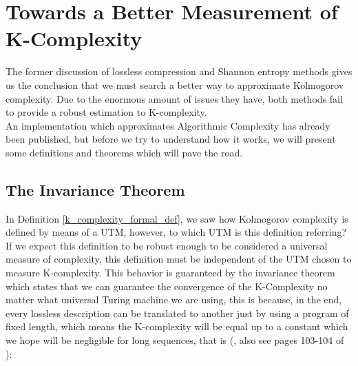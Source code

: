 \section{Towards a Better Measurement of K-Complexity}
The former discussion of lossless compression and Shannon entropy methods gives us the conclusion that we must search a better way to approximate Kolmogorov complexity. Due to the enormous amount of issues they have, both methods fail to provide a robust estimation to K-complexity.\\ 

An implementation which approximates Algorithmic Complexity has already been published, but before we try to understand how it works, we will present some definitions and theorems which will pave the road.


\subsection{The Invariance Theorem}
In Definition \ref{k_complexity_formal_def}, we saw how Kolmogorov complexity is defined by means of a UTM, however, to which UTM is this definition referring? If we expect this definition to be robust enough to be considered a universal measure of complexity, this definition must be independent of the UTM chosen to measure K-complexity. This behavior is guaranteed by the invariance theorem which states that we can guarantee the convergence of the K-Complexity no matter what universal Turing machine we are using, this is because, in the end, every lossless description can be translated to another just by using a program of fixed length, which means the K-complexity will be equal up to a constant which we hope will be negligible for long sequences, that is (\cite{decomposition}, also see pages 103-104 of \cite{kolmo_book}):


